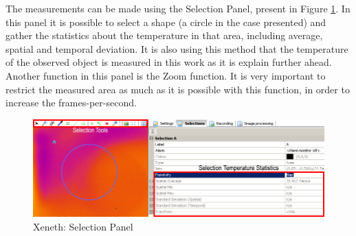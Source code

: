 \par The measurements can be made using the Selection Panel, present in Figure \ref{fig:xeneth3}. In this panel it is possible to select a shape (a circle in the case presented) and gather the statistics about the temperature in that area, including average, spatial and temporal deviation. It is also using this method that the temperature of the observed object is measured in this work as it is explain further ahead. Another function in this panel is the Zoom function. It is very important to restrict the measured area as much as it is possible with this function, in order to increase the frames-per-second. \\
\begin{figure}[h]
\centering
\includegraphics[width=0.7\linewidth]{Figures/3.Chapter/xeneth3.png}
\caption{Xeneth: Selection Panel}
\label{fig:xeneth3}
\end{figure}
